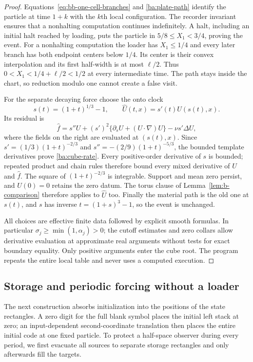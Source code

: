 \begin{proof}
Equations~\eqref{eq:bb-one-cell-branches} and \eqref{ba:plate-path} identify
the particle at time $1+k$ with the $k$th local configuration.  The
recorder invariant ensures that a nonhalting computation continues
indefinitely.  A halt, including an initial halt reached by loading,
puts the particle in $5/8\le X_1<3/4$, proving the event.  For a
nonhalting computation the loader has $X_1\le1/4$ and every later
branch has both endpoint centers below $1/4$.  Its center is their
convex interpolation and its first half-width is at most $\ell/2$.
Thus $0<X_1<1/4+\ell/2<1/2$ at every intermediate time.  The path
stays inside the chart, so reduction modulo one cannot create a false visit.

For the separate decaying force choose the onto clock
\[
 s(t)=(1+t)^{1/3}-1,\qquad \widehat U(t,x)=s'(t)U(s(t),x).
\]
Its residual is
\[
 \widehat f=s''U+(s')^2\{\partial_sU+(U\cdot\nabla)U\}
                                         -\nu s'\Delta U,
\]
where the fields on the right are evaluated at $(s(t),x)$.  Since
$s'=(1/3)(1+t)^{-2/3}$ and $s''=-(2/9)(1+t)^{-5/3}$, the bounded
template derivatives prove \eqref{ba:cube-rate}.  Every positive-order
derivative of $s$ is bounded; repeated product and chain rules therefore
bound every mixed derivative of $\widehat U$ and $\widehat f$.  The
square of $(1+t)^{-2/3}$ is integrable.  Support and mean zero persist,
and $U(0)=0$ retains the zero datum.  The torus clause of
Lemma~\ref{lem:b-comparison} therefore applies to $\widehat U$ too.
Finally the material path is the old one at $s(t)$,
and $s$ has inverse $t=(1+s)^3-1$, so the event is unchanged.

All choices are effective finite data followed by explicit smooth
formulas.  In particular $\sigma_j\ge\min(1,\alpha_j)>0$; the cutoff
estimates and zero collars allow derivative evaluation at approximate real
arguments without tests for exact boundary equality.  Only positive
arguments enter the cube root.  The program repeats the entire local
table and never uses a computed execution.
\end{proof}

\subsection{Storage and periodic forcing without a loader}
\label{ba:parking-section}

The next construction absorbs initialization into the positions of the
state rectangles.  A zero digit for the full blank symbol places the
initial left stack at zero; an input-dependent second-coordinate translation then
places the entire initial code at one fixed particle.  To protect a
half-space observer during every period, we first evacuate all sources
to separate storage rectangles and only afterwards fill the targets.

